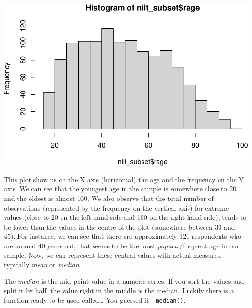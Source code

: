 \documentclass[
]{book}
\newenvironment{Shaded}{\begin{snugshade}}{\end{snugshade}}
\newcommand{\AttributeTok}[1]{\textcolor[rgb]{0.13,0.29,0.53}{#1}}
\newcommand{\ConstantTok}[1]{\textcolor[rgb]{0.56,0.35,0.01}{#1}}
\newcommand{\FunctionTok}[1]{\textcolor[rgb]{0.13,0.29,0.53}{\textbf{#1}}}
\newcommand{\NormalTok}[1]{#1}
\newcommand{\SpecialCharTok}[1]{\textcolor[rgb]{0.81,0.36,0.00}{\textbf{#1}}}
\begin{document}
\begin{Shaded}
\end{Shaded}

\begin{flushleft}\includegraphics[width=1\linewidth]{lab-workbook_files/figure-latex/unnamed-chunk-53-1} \end{flushleft}

This plot show us on the X axis (horizontal) the age and the frequency on the Y axis. We can see that the youngest age in the sample is somewhere close to 20, and the oldest is almost 100. We also observe that the total number of observations (represented by the frequency on the vertical axis) for extreme values (close to 20 on the left-hand side and 100 on the right-hand side), tends to be lower than the values in the centre of the plot (somewhere between 30 and 45). For instance, we can see that there are approximately 120 respondents who are around 40 years old, that seems to be the most \emph{popular}/frequent age in our sample. Now, we can represent these central values with actual measures, typically \emph{mean} or \emph{median}.

The \emph{median} is the mid-point value in a numeric series. If you sort the values and split it by half, the value right in the middle is the median. Luckily there is a function ready to be used called\ldots{} You guessed it - \texttt{median()}.

\begin{Shaded}
\end{Shaded}
\end{document}
